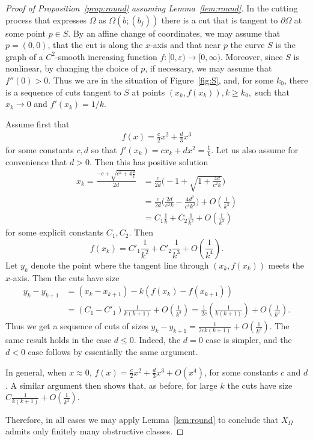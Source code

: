 \documentclass[11pt, reqno]{amsart}
\theoremstyle{remark}
\numberwithin{equation}{subsection}
\numberwithin{figure}{section}
\theoremstyle{customremark}
\newcommand{\Om}{{\Omega}}
\newcommand{\p}{{\partial}}
\newcommand{\eps}{\varepsilon}
\begin{document}
\begin{proof}[Proof of Proposition~\ref{prop:round} assuming Lemma~\ref{lem:round}] In the cutting process that expresses $\Om$ as $\Om(b;(b_j))$ there is a cut that is tangent to $\p \Om$ at some point $p\in S$. 
 By an affine change of coordinates, we may assume that $p = (0,0)$, that the cut is along the $x$-axis and that near $p$ the curve $S$ is the graph of a $C^2$-smooth increasing function $f:[0,\eps)\to [0,\infty)$.  Moreover, since $S$ is nonlinear,   by changing the choice of $p$, if necessary, we may assume that $f''(0)>0$.  
 Thus we are in the situation of Figure~\ref{fig:S}, and, for some $k_0$, there is a sequence of cuts tangent to $S$ at points $(x_k,f(x_k)), k\ge k_0, $ such that $x_k\to 0$ and $f'(x_k) = 1/k$.
 
 Assume first that
 \begin{align*}
 f(x) = \frac{c}{2} x^2 + \frac{d}{3} x^3
 \end{align*}
  for some constants $c,d$ so that
 $f'(x_k) = cx_k + d x^2= \frac 1k$.  Let us also assume for convenience that $d > 0$.  Then this has positive solution
\begin{align*} x_k = \frac{ -c + \sqrt{ c^2 + 4\frac{d}{k} }}{2d} &= \frac{c}{2d} \bigl(-1 + \sqrt{1 + \frac{4d}{c^2k}}\bigr) \\
& = \frac{c}{2d}\bigl(\frac{2d}{c^2k} - \frac{4d^2}{c^4 k^2}\bigr) + O(\frac{1}{k^3})\\
& = C_1 \frac{1}{k} + C_2 \frac{1}{k^2} + O(\frac{1}{k^3})
\end{align*}
 for some explicit constants $C_1, C_2$.  Then 
 \[ f(x_k) =  C'_1 \frac{1}{k^2} + C'_2 \frac{1}{k^3} + O(\frac{1}{k^4}).\]
 Let $y_k$ denote the point where the tangent line through $(x_k,f(x_k))$ meets the $x$-axis.  Then the cuts have size
\begin{align*} y_k - y_{k+1} &= (x_k - x_{k+1}) - k ( f(x_k) - f(x_{k+1}) ) \\
&= (C_1 - C'_1) \frac{1}{k(k+1)} + O( \frac{1}{k^3}) = \frac{1}{2c} ( \frac{1}{k(k+1)}) + O( \frac{1}{k^3}).
\end{align*}
 Thus we get a sequence of cuts of sizes $y_k - y_{k+1} = \frac{1}{2ck(k+1)} + O(\frac{1}{k^3})$.  The same result holds in the case $d \le 0$. Indeed, the $d = 0$ case is simpler, and  the $d < 0$ case follows by essentially the same argument.
 
 In general,   when $x\approx 0$, $f(x) = \frac{c}{2} x^2 + \frac{d}{3} x^3 + O(x^4)$, for some constants $c$ and $d$. A similar argument then shows that, as before, for large $k$ the cuts have size $C \frac{1}{k(k+1)}+ O(\frac1{k^3})$. 
 
 Therefore, in all cases we may apply Lemma~\ref{lem:round} to conclude that $X_\Om$ admits only finitely many obstructive classes. 

  \end{proof}
  
\end{document}
